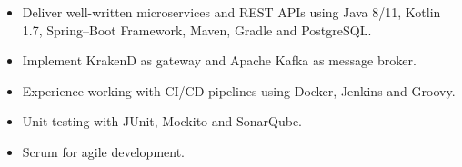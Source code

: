 \documentclass[10pt,a4paper,ragged2e]{altacv}
\begin{document}

\begin{fullwidth}
\makecvheader
\end{fullwidth}




\begin{itemize}
    \item Deliver well-written microservices and REST APIs using Java 8/11, Kotlin 1.7, Spring--Boot Framework, Maven, Gradle and PostgreSQL.
    \item Implement KrakenD as gateway and Apache Kafka as message broker.
    \item Experience working with CI/CD pipelines using Docker, Jenkins and Groovy.
    \item Unit testing with JUnit, Mockito and SonarQube.
    \item Scrum for agile development.
\end{itemize}

\vspace{10px}

\vspace{10px}
\end{document}
